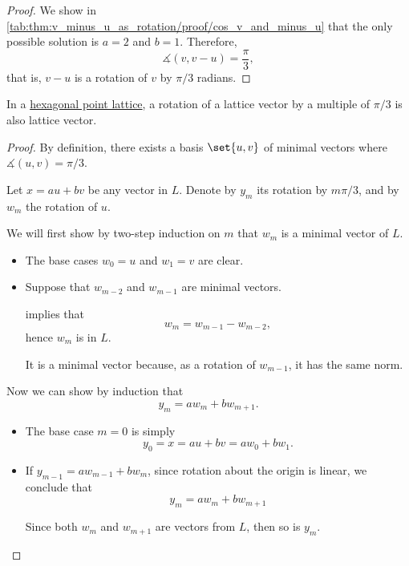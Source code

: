 \begin{proof}
  We show in \cref{tab:thm:v_minus_u_as_rotation/proof/cos_v_and_minus_u} that the only possible solution is \( a = 2 \) and \( b = 1 \). Therefore,
  \begin{equation*}
    \measuredangle(v, v - u) = \frac \pi 3,
  \end{equation*}
  that is, \( v - u \) is a rotation of \( v \) by \( \pi / 3 \) radians.
\end{proof}

\begin{proposition}\label{thm:hexagonal_point_lattice_vector_rotation}
  In a \hyperref[def:hexagonal_point_lattice]{hexagonal point lattice}, a rotation of a lattice vector by a multiple of \( \pi / 3 \) is also lattice vector.
\end{proposition}
\begin{proof}
  By definition, there exists a basis \( \set{ u, v } \) of minimal vectors where \( \measuredangle(u, v) = \pi / 3 \).

  Let \( x = au + bv \) be any vector in \( L \). Denote by \( y_m \) its rotation by \( m\pi / 3 \), and by \( w_m \) the rotation of \( u \).

  We will first show by two-step induction on \( m \) that \( w_m \) is a minimal vector of \( L \).
  \begin{itemize}
    \item The base cases \( w_0 = u \) and \( w_1 = v \) are clear.
    \item Suppose that \( w_{m-2} \) and \( w_{m-1} \) are minimal vectors.

     implies that
    \begin{equation*}
      w_m = w_{m-1} - w_{m-2},
    \end{equation*}
    hence \( w_m \) is in \( L \).

    It is a minimal vector because, as a rotation of \( w_{m-1} \), it has the same norm.
  \end{itemize}

  Now we can show by induction that
  \begin{equation}\label{eq:thm:hexagonal_point_lattice_vector_rotation/recurrence}
    y_m = a w_m + b w_{m+1}.
  \end{equation}

  \begin{itemize}
    \item The base case \( m = 0 \) is simply
    \begin{equation*}
      y_0 = x = au + bv = a w_0 + b w_1.
    \end{equation*}

    \item If \( y_{m-1} = a w_{m-1} + b w_m \), since rotation about the origin is linear, we conclude that
    \begin{equation*}
      y_m = a w_m + b w_{m+1}
    \end{equation*}

    Since both \( w_m \) and \( w_{m+1} \) are vectors from \( L \), then so is \( y_m \).
  \end{itemize}
\end{proof}

